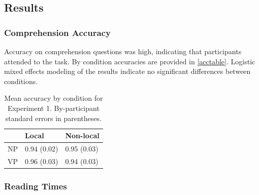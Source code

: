 \documentclass[12pt]{article}
\begin{document}
\subsection{Results}
\label{sec:results}

\subsubsection{Comprehension Accuracy}
\label{sec:acc}

Accuracy on comprehension questions was high, indicating that participants attended to the task. By condition accuracies are provided in \ref{acctable}. Logistic mixed effects modeling of the results indicate no significant differences between conditions. 

\begin{table}[ht]
\centering
\begin{tabular}{rll}
  \hline
 & Local & Non-local \\ 
  \hline
NP & 0.94 (0.02) & 0.95 (0.03) \\ 
  VP & 0.96 (0.03) & 0.94 (0.03) \\ 
   \hline
\end{tabular}
\caption{Mean accuracy by condition for Experiment 1. By-participant standard errors in parentheses.} 
\end{table}
\subsubsection{Reading Times}
\label{sec:rts}
\end{document}
